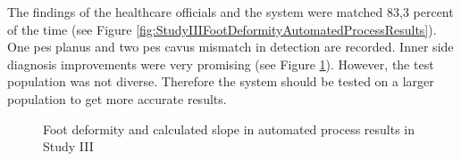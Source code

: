 The findings of the healthcare officials and the system were matched 83,3 percent of the time (see Figure \ref{fig:StudyIIIFootDeformityAutomatedProcessResults}). One pes planus and two pes cavus mismatch in detection are recorded. Inner side diagnosis improvements were very promising (see Figure \ref{fig:StudyIIISlopeResults}). However, the test population was not diverse. Therefore the system should be tested on a larger population to get more accurate results.

\begin{figure}[htbp]
\centering
{}
\caption{Foot deformity and calculated slope in automated process results in Study III}
\label{fig:StudyIIISlopeResults}
\end{figure} 


